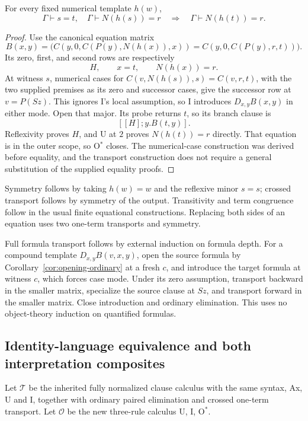 \begin{theorem}
\label{thm:opening-transport}
For every fixed numerical template $h(w)$,
\[
 \Gamma\vdash s=t,\quad\Gamma\vdash N(h(s))=r
 \quad\Longrightarrow\quad\Gamma\vdash N(h(t))=r.
\]
\end{theorem}
\begin{proof}
Use the canonical equation matrix
\[
 B(x,y)=
 \bigl(C(y,0,C(P(y),N(h(x)),x))
      =C(y,0,C(P(y),r,t))\bigr).
\]
Its zero, first, and second rows are respectively
\[
 H,\qquad x=t,\qquad N(h(x))=r.
\]
At witness $s$, numerical cases for
$C(v,N(h(s)),s)=C(v,r,t)$, with the two supplied premises as its zero
and successor cases, give the successor row at $v=P(Sz)$. This ignores
I's local assumption, so I introduces $D_{x,y}B(x,y)$ in either mode.
Open that major. Its probe returns $t$, so its branch clause is
\[
 [[H];y.B(t,y)].
\]
Reflexivity proves $H$, and U at $2$ proves $N(h(t))=r$ directly.
That equation is in the outer scope, so O$^*$ closes. The numerical-case
construction was derived before equality, and the transport construction
does not require a general substitution of the supplied equality proofs.
\end{proof}

Symmetry follows by taking $h(w)=w$ and the reflexive minor $s=s$;
crossed transport follows by symmetry of the output. Transitivity and
term congruence follow in the usual finite equational constructions.
Replacing both sides of an equation uses two one-term transports and
symmetry.

Full formula transport follows by external induction on formula depth.
For a compound template $D_{x,y}B(v,x,y)$, open the source formula by
Corollary~\ref{cor:opening-ordinary} at a fresh $c$, and introduce the
target formula at witness $c$, which forces case mode. Under its zero
assumption, transport backward in the smaller matrix, specialize the
source clause at $Sz$, and transport forward in the smaller matrix.
Close introduction and ordinary elimination. This uses no object-theory
induction on quantified formulas.

\subsection{Identity-language equivalence and both interpretation composites}

Let $\mathcal T$ be the inherited fully normalized clause calculus with
the same syntax, Ax, U and I, together with ordinary paired elimination
and crossed one-term transport. Let $\mathcal O$ be the new three-rule
calculus U, I, O$^*$.


